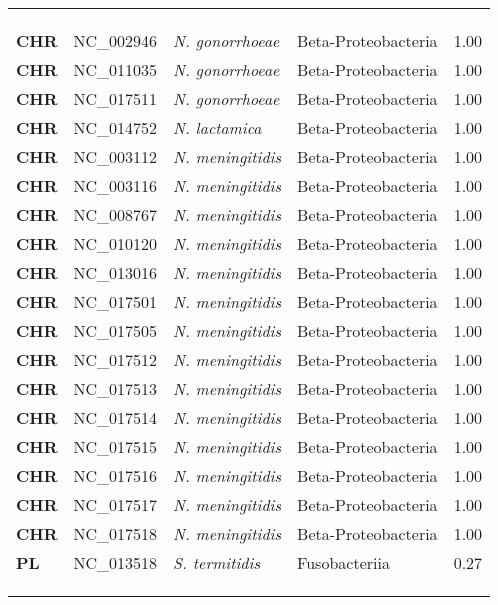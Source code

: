 \begin{adjustwidth}{-3cm}{2cm}
{\begin{supertabular}{>{\bfseries}l|p{0.1\textwidth}p{0.14\textwidth}l|l}
\\
\\
\hline\\
CHR & NC\_002946 & \textit{N. gonorrhoeae} & Beta-Proteobacteria & 1.00\\
CHR & NC\_011035 & \textit{N. gonorrhoeae} & Beta-Proteobacteria & 1.00\\
CHR & NC\_017511 & \textit{N. gonorrhoeae} & Beta-Proteobacteria & 1.00\\
CHR & NC\_014752 & \textit{N. lactamica} & Beta-Proteobacteria & 1.00\\
CHR & NC\_003112 & \textit{N. meningitidis} & Beta-Proteobacteria & 1.00\\
CHR & NC\_003116 & \textit{N. meningitidis} & Beta-Proteobacteria & 1.00\\
CHR & NC\_008767 & \textit{N. meningitidis} & Beta-Proteobacteria & 1.00\\
CHR & NC\_010120 & \textit{N. meningitidis} & Beta-Proteobacteria & 1.00\\
CHR & NC\_013016 & \textit{N. meningitidis} & Beta-Proteobacteria & 1.00\\
CHR & NC\_017501 & \textit{N. meningitidis} & Beta-Proteobacteria & 1.00\\
CHR & NC\_017505 & \textit{N. meningitidis} & Beta-Proteobacteria & 1.00\\
CHR & NC\_017512 & \textit{N. meningitidis} & Beta-Proteobacteria & 1.00\\
CHR & NC\_017513 & \textit{N. meningitidis} & Beta-Proteobacteria & 1.00\\
CHR & NC\_017514 & \textit{N. meningitidis} & Beta-Proteobacteria & 1.00\\
CHR & NC\_017515 & \textit{N. meningitidis} & Beta-Proteobacteria & 1.00\\
CHR & NC\_017516 & \textit{N. meningitidis} & Beta-Proteobacteria & 1.00\\
CHR & NC\_017517 & \textit{N. meningitidis} & Beta-Proteobacteria & 1.00\\
CHR & NC\_017518 & \textit{N. meningitidis} & Beta-Proteobacteria & 1.00\\
PL & NC\_013518 & \textit{S. termitidis} & Fusobacteriia & 0.27\\
\\
\\
\hline\\

\end{supertabular}}
\end{adjustwidth}
